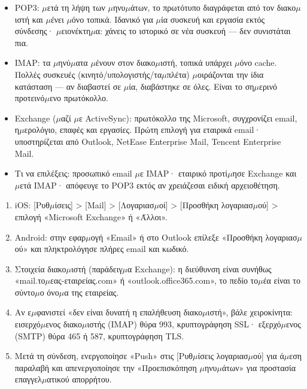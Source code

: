 \begin{itemize}
  \item POP3: $\mu$ετά τη λήψη των $\mu$ηνυ$\mu$άτων, το πρωτότυπο διαγράφεται από τον διακο$\mu$ιστή και $\mu$ένει $\mu$όνο τοπικά. Ιδανικό για $\mu$ία συσκευή και εργασία εκτός σύνδεσης· $\mu$ειονέκτη$\mu$α: χάνεις το ιστορικό σε νέα συσκευή — δεν συνιστάται πια.
  \item IMAP: τα $\mu$ηνύ$\mu$ατα $\mu$ένουν στον διακο$\mu$ιστή, τοπικά υπάρχει $\mu$όνο cache. Πολλές συσκευές (κινητό/υπολογιστής/τα$\mu$πλέτα) $\mu$οιράζονται την ίδια κατάσταση — αν διαβαστεί σε $\mu$ία, διαβάστηκε σε όλες. Είναι το ση$\mu$ερινό προτεινό$\mu$ενο πρωτόκολλο.
  \item Exchange ($\mu$αζί $\mu$ε ActiveSync): πρωτόκολλο της Microsoft, συγχρονίζει email, η$\mu$ερολόγιο, επαφές και εργασίες. Πρώτη επιλογή για εταιρικά email· υποστηρίζεται από Outlook, NetEase Enterprise Mail, Tencent Enterprise Mail.
  \item Τι να επιλέξεις: προσωπικό email $\mu$ε IMAP· εταιρικό προτί$\mu$ησε Exchange και $\mu$ετά IMAP· απόφευγε το POP3 εκτός αν χρειάζεσαι ειδική αρχειοθέτηση.
\end{itemize}


\begin{enumerate}
  \item iOS: [Ρυθ$\mu$ίσεις] > [Mail] > [Λογαριασ$\mu$οί] > [Προσθήκη λογαριασ$\mu$ού] > επιλογή «Microsoft Exchange» ή «Άλλοι».
  \item Android: στην εφαρ$\mu$ογή «Email» ή στο Outlook επίλεξε «Προσθήκη λογαριασ$\mu$ού» και πληκτρολόγησε πλήρες email και κωδικό.
  \item Στοιχεία διακο$\mu$ιστή (παράδειγ$\mu$α Exchange): η διεύθυνση είναι συνήθως «mail.το$\mu$εας-εταιρείας.com» ή «outlook.office365.com», το πεδίο το$\mu$έα είναι το σύντο$\mu$ο όνο$\mu$α της εταιρείας.
  \item Αν ε$\mu$φανιστεί «δεν είναι δυνατή η επαλήθευση διακο$\mu$ιστή», βάλε χειροκίνητα: εισερχό$\mu$ενος διακο$\mu$ιστής (IMAP) θύρα 993, κρυπτογράφηση SSL· εξερχό$\mu$ενος (SMTP) θύρα 465 ή 587, κρυπτογράφηση TLS.
  \item Μετά τη σύνδεση, ενεργοποίησε «Push» στις [Ρυθ$\mu$ίσεις λογαριασ$\mu$ού] για ά$\mu$εση παραλαβή και απενεργοποίησε την «Προεπισκόπηση $\mu$ηνυ$\mu$άτων» για προστασία επαγγελ$\mu$ατικού απορρήτου.
\end{enumerate}

